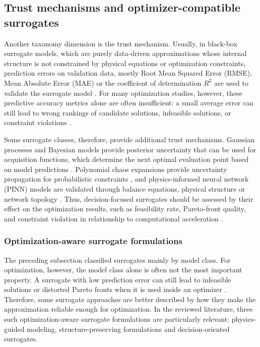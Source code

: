\subsection{Trust mechanisms and optimizer-compatible surrogates}
\label{sec:tax:trust-mechanisms}

Another taxonomy dimension is the trust mechanism. Usually, in black-box
surrogate models, which are purely data-driven approximations whose
internal structure is not constrained by physical equations or
optimization constraints, prediction errors on validation data, mostly
Root Mean Squared Error (RMSE), Mean Absolute Error (MAE) or the
coefficient of determination $R^2$ are used to validate the surrogate
model \cite{Westermann2019,Zhang2026_building,Elwy2024}. For many
optimization studies, however, these predictive accuracy metrics alone
are often insufficient: a small average error can still lead to wrong
rankings of candidate solutions, infeasible solutions, or constraint
violations \cite{DiazManriquez2016,Ruan2021221,Khaloie2025,Lim2025}.

Some surrogate classes, therefore, provide additional trust mechanisms.
Gaussian processes and Bayesian models provide posterior uncertainty
that can be used for acquisition functions, which determine the next
optimal evaluation point based on model predictions
\cite{Hu2020,Hu2021671,Tan2026}. Polynomial chaos expansions provide
uncertainty propagation for probabilistic constraints
\cite{Muhlpfordt20194806,Safta20172535,Koirala20242284}, and
physics-informed neural network (PINN) models are validated through
balance equations, physical structure or network topology
\cite{Park2019,Su2022315,Mohammadi2024,Petrova2025,Du2025}. Thus,
decision-focused surrogates should be assessed by their effect on the
optimization results, such as feasibility rate, Pareto-front quality,
and constraint violation in relationship to computational acceleration
\cite{Ruan2021221,Khaloie2025,Lim2025,Chen20244723}.

\subsubsection{Optimization-aware surrogate formulations}
\label{sec:tax:physics-guided}

The preceding subsection classified surrogates mainly by model class.
For optimization, however, the model class alone is often not the most
important property. A surrogate with low prediction error can still lead
to infeasible solutions or distorted Pareto fronts when it is used
inside an optimizer
\cite{DiazManriquez2016,Ruan2021221,Khaloie2025,Lim2025}. Therefore,
some surrogate approaches are better described by how they make the
approximation reliable enough for optimization. In the reviewed
literature, three such optimization-aware surrogate formulations are
particularly relevant: physics-guided modeling, structure-preserving
formulations and decision-oriented surrogates.


